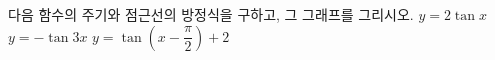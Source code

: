 다음 함수의 주기와 점근선의 방정식을 구하고, 그 그래프를 그리시오.
 $y=2\tan x$
 $y=-\tan 3x$
 $y=\tan\left(x-\dfrac{\pi}{2}\right)+2$
